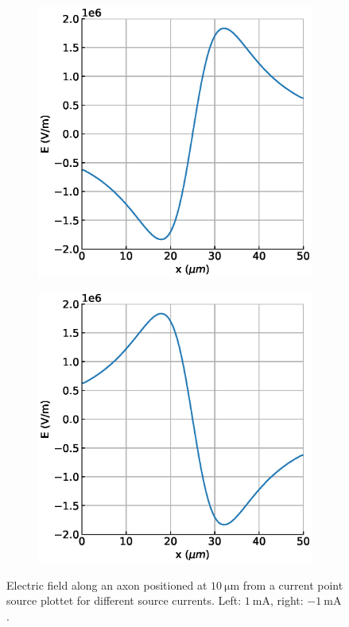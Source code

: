 \documentclass{scrartcl}			%
\begin{document}
\begin{figure}[H] 
  \begin{subfigure}[b]{0.5\linewidth}
    \centering
    \includegraphics[width=\linewidth]{imgs/e_field_0.eps} 
    \label{fig:ext0} 
  \end{subfigure}%
  \quad
  \begin{subfigure}[b]{0.5\linewidth}
    \centering
    \includegraphics[width=\linewidth]{imgs/e_field_1.eps} 
    \label{fig:ext1} 
    \end{subfigure} 
  \caption{Electric field along an axon positioned at $\SI{10}{\micro\meter}$ from a current point source  plottet for different source currents. Left: $\SI{1}{\milli\ampere}$, right: $\SI{-1}{\milli\ampere}$.}
  \label{fig:istim} 
\end{figure}
\end{document}
